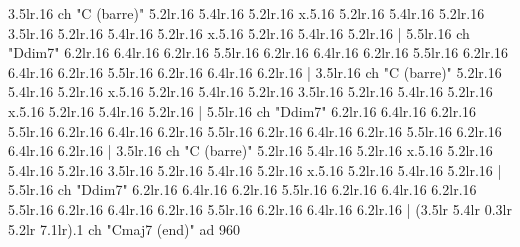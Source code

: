 3.5{lr}.16 {ch "C (barre)"} 5.2{lr}.16 5.4{lr}.16 5.2{lr}.16 x.5.16 5.2{lr}.16 5.4{lr}.16 5.2{lr}.16 3.5{lr}.16 5.2{lr}.16 5.4{lr}.16 5.2{lr}.16 x.5.16 5.2{lr}.16 5.4{lr}.16 5.2{lr}.16 |
5.5{lr}.16 {ch "Ddim7"} 6.2{lr}.16 6.4{lr}.16 6.2{lr}.16 5.5{lr}.16 6.2{lr}.16 6.4{lr}.16 6.2{lr}.16 5.5{lr}.16 6.2{lr}.16 6.4{lr}.16 6.2{lr}.16 5.5{lr}.16 6.2{lr}.16 6.4{lr}.16 6.2{lr}.16 |
3.5{lr}.16 {ch "C (barre)"} 5.2{lr}.16 5.4{lr}.16 5.2{lr}.16 x.5.16 5.2{lr}.16 5.4{lr}.16 5.2{lr}.16 3.5{lr}.16 5.2{lr}.16 5.4{lr}.16 5.2{lr}.16 x.5.16 5.2{lr}.16 5.4{lr}.16 5.2{lr}.16 |
5.5{lr}.16 {ch "Ddim7"} 6.2{lr}.16 6.4{lr}.16 6.2{lr}.16 5.5{lr}.16 6.2{lr}.16 6.4{lr}.16 6.2{lr}.16 5.5{lr}.16 6.2{lr}.16 6.4{lr}.16 6.2{lr}.16 5.5{lr}.16 6.2{lr}.16 6.4{lr}.16 6.2{lr}.16 |
3.5{lr}.16 {ch "C (barre)"} 5.2{lr}.16 5.4{lr}.16 5.2{lr}.16 x.5.16 5.2{lr}.16 5.4{lr}.16 5.2{lr}.16 3.5{lr}.16 5.2{lr}.16 5.4{lr}.16 5.2{lr}.16 x.5.16 5.2{lr}.16 5.4{lr}.16 5.2{lr}.16 |
5.5{lr}.16 {ch "Ddim7"} 6.2{lr}.16 6.4{lr}.16 6.2{lr}.16 5.5{lr}.16 6.2{lr}.16 6.4{lr}.16 6.2{lr}.16 5.5{lr}.16 6.2{lr}.16 6.4{lr}.16 6.2{lr}.16 5.5{lr}.16 6.2{lr}.16 6.4{lr}.16 6.2{lr}.16 |
(3.5{lr} 5.4{lr} 0.3{lr} 5.2{lr} 7.1{lr}).1 {ch "Cmaj7 (end)" ad 960}